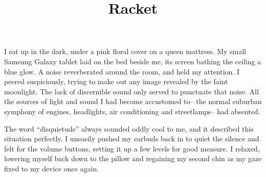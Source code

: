\documentclass[12pt]{article}
\title{Racket}
\begin{document}
\makeheader
\hspace{0.5in}
I sat up in the dark, under a pink floral cover on a queen mattress.  My small Samsung Galaxy tablet laid on the bed beside me, its screen bathing the ceiling a blue glow.  A noise reverberated around the room, and held my attention.  I peered suspiciously, trying to make out any image revealed by the faint moonlight.  The lack of discernible sound only served to punctuate that noise.  All the sources of light and sound I had become accustomed to-- the normal suburban symphony of engines, headlights, air conditioning and streetlamps-- had absented.

The word ``disquietude'' always sounded oddly cool to me, and it described this situation perfectly.  I uneasily pushed my earbuds back in to quiet the silence and felt for the volume buttons, setting it up a few levels for good measure.  I relaxed, lowering myself back down to the pillow and regaining my second chin as my gaze fixed to my device once again.
\end{document}
